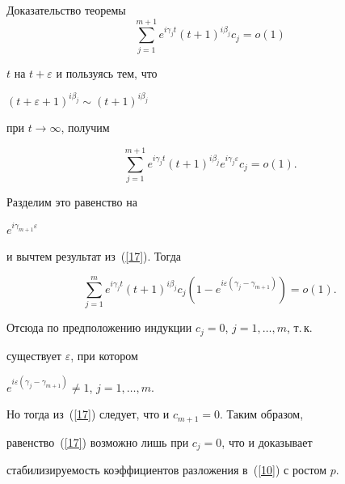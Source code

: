 \begin{pf*}{Доказательство теоремы}
\begin{equation}
\sum\limits_{j=1}^{m+1}


e^{i\gamma_jt}(t+1)^{i\beta_{j}}c_j=o (1)


\end{equation}


$t$ на $t+\varepsilon$ и пользуясь тем, что 


$(t+\varepsilon+1)^{i\beta_{j}}\sim(t+1)^{i\beta_{j}}$ 


при $t \to \infty$, получим


$$


\sum\limits_{j=1}^{m+1}


e^{i\gamma_jt}(t+1)^{i\beta_{j}}e^{i\gamma_j \varepsilon }c_j=o (1).


$$


Разделим это равенство на 


$e^{i\gamma_{m+1}\varepsilon}$


и вычтем результат из~(\ref{17}). Тогда


$$


\sum\limits_{j=1}^{m}


e^{i\gamma_jt}(t+1)^{i\beta_{j}}c_j


(1-e^{i\varepsilon (\gamma_j-\gamma_{m+1})})=o (1).


$$


Отсюда по предположению индукции $c_j=0$, $j=1,\dotsc,m$, т.\,к.


существует $\varepsilon$, при котором 


$ e^{i\varepsilon (\gamma_j-\gamma_{m+1})}\neq1$, $j=1,\dotsc,m$.


Но тогда из~(\ref{17}) следует, что и $c_{m+1}=0$. Таким образом, 


равенство~(\ref{17}) возможно лишь при $c_j=0$, что и доказывает 


стабилизируемость коэффициентов разложения в~(\ref{10}) с ростом $p$.


\end{pf*}





